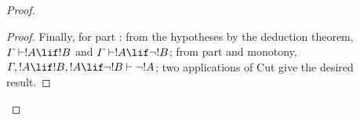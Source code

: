 \documentclass[../../include/open-logic-section]{subfiles}
\begin{document}
\begin{proof}
\begin{proof}
\smallskip\noindent
Finally, for part : from the hypotheses by the
deduction theorem, $\Gamma \Proves !A \lif !B$ and $\Gamma
\Proves !A \lif \lnot !B$; from part 
and monotony, $\Gamma, !A \lif !B, !A \lif \lnot !B
  \Proves \lnot !A$; two applications of Cut give the desired result. 
\end{proof}


\end{proof}
\end{document}

